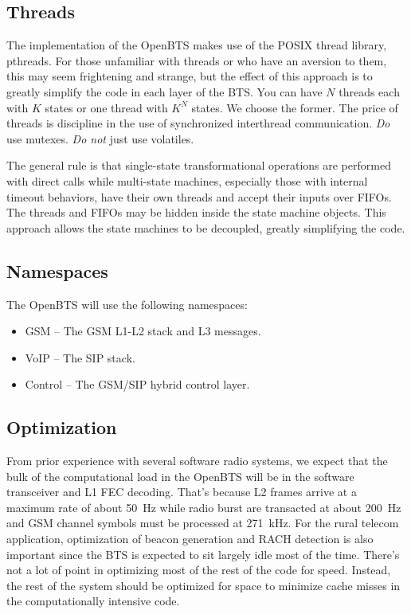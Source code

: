 \documentclass[11pt]{book}
\begin{document}
\subsection{Threads}
The implementation of the OpenBTS makes use of the POSIX thread library, pthreads. For those unfamiliar with threads or who have an aversion to them, this may seem frightening and strange, but the effect of this approach is to greatly simplify the code in each layer of the BTS.  You can have $N$ threads each with $K$ states or one thread with $K^N$ states.  We choose the former.  The price of threads is discipline in the use of synchronized interthread communication.  \emph{Do} use mutexes. \emph{Do not} just use volatiles.

The general rule is that single-state transformational operations are performed with direct calls while multi-state machines, especially those with internal timeout behaviors, have their own threads and accept their inputs over FIFOs.  The threads and FIFOs may be hidden inside the state machine objects.  This approach allows the state machines to be decoupled, greatly simplifying the code.


\subsection{Namespaces}
The OpenBTS will use the following namespaces:

\begin{itemize}
	\item GSM -- The GSM L1-L2 stack and L3 messages.
	\item VoIP -- The SIP stack.
	\item Control -- The GSM/SIP hybrid control layer.
\end{itemize}



\subsection{Optimization}
From prior experience with several software radio systems, we expect that the bulk of the computational load in the OpenBTS will be in the software transceiver and L1 FEC decoding.
That's because L2 frames arrive at a maximum rate of about 50~Hz while radio burst are transacted at about 200~Hz and GSM channel symbols must be processed at 271~kHz.
For the rural telecom application, optimization of beacon generation and RACH detection is also important since the BTS is expected to sit largely idle most of the time.  There's not a lot of point in optimizing most of the rest of the code for speed.  Instead, the rest of the system should be optimized for space to minimize cache misses in the computationally intensive code.
\end{document}
